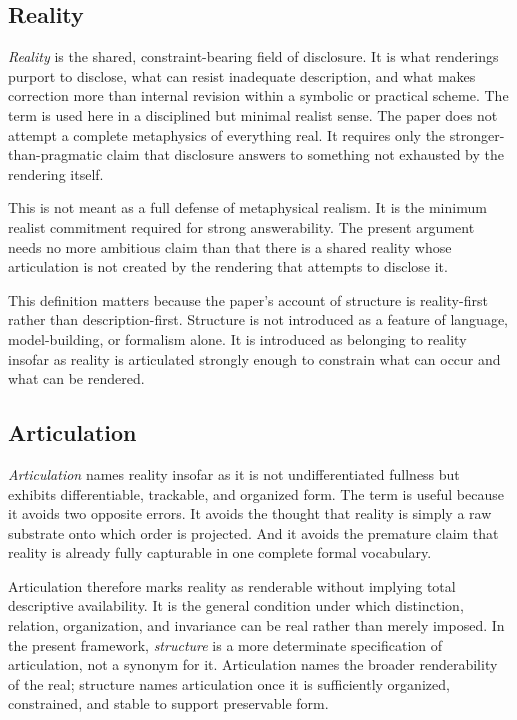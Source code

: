 \documentclass[11pt]{article}
\renewcommand{\emph}[1]{\textit{#1}}
\begin{document}
\subsection{Reality}

\emph{Reality} is the shared, constraint-bearing field of disclosure. It is what renderings purport to disclose, what can resist inadequate description, and what makes correction more than internal revision within a symbolic or practical scheme. The term is used here in a disciplined but minimal realist sense. The paper does not attempt a complete metaphysics of everything real. It requires only the stronger-than-pragmatic claim that disclosure answers to something not exhausted by the rendering itself. \cite{Chakravartty2011ScientificRealismSEP,Putnam1983RealismReason}

This is not meant as a full defense of metaphysical realism. It is the minimum realist commitment required for strong answerability. The present argument needs no more ambitious claim than that there is a shared reality whose articulation is not created by the rendering that attempts to disclose it.

This definition matters because the paper's account of structure is reality-first rather than description-first. Structure is not introduced as a feature of language, model-building, or formalism alone. It is introduced as belonging to reality insofar as reality is articulated strongly enough to constrain what can occur and what can be rendered.

\subsection{Articulation}

\emph{Articulation} names reality insofar as it is not undifferentiated fullness but exhibits differentiable, trackable, and organized form. The term is useful because it avoids two opposite errors. It avoids the thought that reality is simply a raw substrate onto which order is projected. And it avoids the premature claim that reality is already fully capturable in one complete formal vocabulary.

Articulation therefore marks reality as renderable without implying total descriptive availability. It is the general condition under which distinction, relation, organization, and invariance can be real rather than merely imposed. In the present framework, \emph{structure} is a more determinate specification of articulation, not a synonym for it. Articulation names the broader renderability of the real; structure names articulation once it is sufficiently organized, constrained, and stable to support preservable form.
\end{document}
